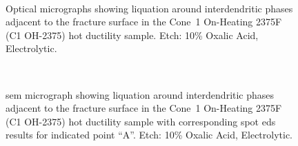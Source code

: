\begin{figure}
\centering
{} \\
\caption{Optical micrographs showing liquation around interdendritic phases adjacent to the fracture surface in the Cone~1 On-Heating 2375\textdegree{}F (C1 OH-2375) hot ductility sample. Etch: 10\% Oxalic Acid, Electrolytic.}
\label{fig:c1-oh-2375-fracture-liquation}
\end{figure}

\begin{figure}
\centering
{} \\
\caption{\Gls{sem} micrograph showing liquation around interdendritic phases adjacent to the fracture surface in the Cone~1 On-Heating 2375\textdegree{}F (C1 OH-2375) hot ductility sample with corresponding spot \gls{eds} results for indicated point ``A''. Etch: 10\% Oxalic Acid, Electrolytic.}
\label{fig:c1-oh-2375-fracture-liquation-sem}
\end{figure}

